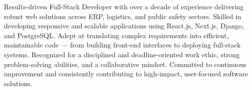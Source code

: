 
\noindent\parbox{\textwidth}{
Results-driven Full-Stack Developer with over a decade of experience delivering robust web solutions across ERP, logistics, and public safety sectors. Skilled in developing responsive and scalable applications using React.js, Next.js, Django, and PostgreSQL. Adept at translating complex requirements into efficient, maintainable code — from building front-end interfaces to deploying full-stack systems. Recognized for a disciplined and deadline-oriented work ethic, strong problem-solving abilities, and a collaborative mindset. Committed to continuous improvement and consistently contributing to high-impact, user-focused software solutions.
}